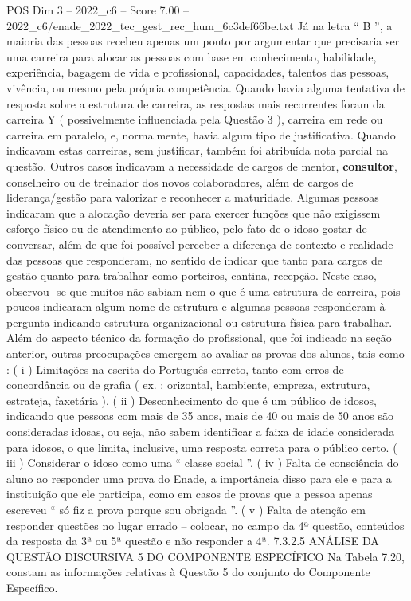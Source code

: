 \begin{textsample}{POS Dim 3 – 2022\_c6 – Score 7.00 – 2022\_c6/enade\_2022\_tec\_gest\_rec\_hum\_6c3def66be.txt}
Já na letra “ B ”, a maioria das pessoas recebeu apenas um ponto por argumentar que precisaria ser uma carreira para alocar as pessoas com base em conhecimento, habilidade, experiência, bagagem de vida e profissional, capacidades, talentos das pessoas, vivência, ou mesmo pela própria competência.
Quando havia alguma tentativa de resposta sobre a estrutura de carreira, as respostas mais recorrentes foram da carreira Y ( possivelmente influenciada pela Questão 3 ), carreira em rede ou carreira em paralelo, e, normalmente, havia algum tipo de justificativa.
Quando indicavam estas carreiras, sem justificar, também foi atribuída nota parcial na questão.
Outros casos indicavam a necessidade de cargos de mentor, \textbf{consultor}, conselheiro ou de treinador dos novos colaboradores, além de cargos de liderança/gestão para valorizar e reconhecer a maturidade.
Algumas pessoas indicaram que a alocação deveria ser para exercer funções que não exigissem esforço físico ou de atendimento ao público, pelo fato de o idoso gostar de conversar, além de que foi possível perceber a diferença de contexto e realidade das pessoas que responderam, no sentido de indicar que tanto para cargos de gestão quanto para trabalhar como porteiros, cantina, recepção.
Neste caso, observou -se que muitos não sabiam nem o que é uma estrutura de carreira, pois poucos indicaram algum nome de estrutura e algumas pessoas responderam à pergunta indicando estrutura organizacional ou estrutura física para trabalhar.
Além do aspecto técnico da formação do profissional, que foi indicado na seção anterior, outras preocupações emergem ao avaliar as provas dos alunos, tais como : ( i ) Limitações na escrita do Português correto, tanto com erros de concordância ou de grafia ( ex. : orizontal, hambiente, empreza, extrutura, estrateja, faxetária ). ( ii ) Desconhecimento do que é um público de idosos, indicando que pessoas com mais de 35 anos, mais de 40 ou mais de 50 anos são consideradas idosas, ou seja, não sabem identificar a faixa de idade considerada para idosos, o que limita, inclusive, uma resposta correta para o público certo. ( iii ) Considerar o idoso como uma “ classe social ”. ( iv ) Falta de consciência do aluno ao responder uma prova do Enade, a importância disso para ele e para a instituição que ele participa, como em casos de provas que a pessoa apenas escreveu “ só fiz a prova porque sou obrigada ”. ( v ) Falta de atenção em responder questões no lugar errado – colocar, no campo da 4ª questão, conteúdos da resposta da 3ª ou 5ª questão e não responder a 4ª. 7.3.2.5 ANÁLISE DA QUESTÃO DISCURSIVA 5 DO COMPONENTE ESPECÍFICO Na Tabela 7.20, constam as informações relativas à Questão 5 do conjunto do Componente Específico.

\end{textsample}
